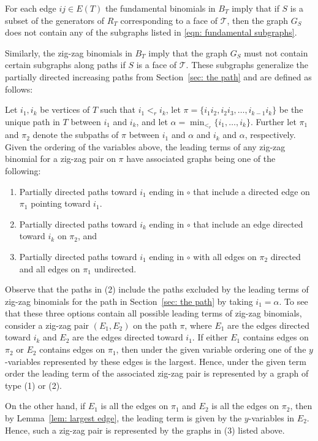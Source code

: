 \documentclass[11pt]{article}
\theoremstyle{definition}
\numberwithin{equation}{section}
\begin{document}
For each edge $ij\in E(T)$ the fundamental binomials in $B_T$ imply that if $S$ is a subset of the generators of $R_T$ corresponding to a face of $\mathcal{T}$, then the graph $G_S$ does not contain any of the subgraphs listed in \eqref{eqn: fundamental subgraphs}.


Similarly, the zig-zag binomials in $B_T$ imply that the graph $G_S$ must not contain certain subgraphs along paths if $S$ is a face of $\mathcal{T}$. These subgraphs generalize the partially directed increasing paths from Section~\ref{sec: the path} and are defined as follows:

Let $i_1,i_k$ be vertices of $T$ such that $i_1 <_r i_k$, let $\pi = \{i_1i_2, i_2i_3, \ldots, i_{k-1}i_k\}$ be the unique path in $T$ between $i_1$ and $i_k$, and let $\alpha = \min_{<_r}\{i_1,\ldots, i_k\}$. 
Further let $\pi_1$ and $\pi_2$ denote the subpaths of $\pi$ between $i_1$ and $\alpha$ and $i_k$ and $\alpha$, respectively. 
Given the ordering of the variables above, the leading terms of any zig-zag binomial for a zig-zag pair on $\pi$ have associated graphs being one of the following:
\begin{enumerate}
    \item Partially directed paths toward $i_1$ ending in $\circ$ that include a directed edge on $\pi_1$ pointing toward $i_1$. 
    \item Partially directed paths toward $i_k$ ending in $\circ$ that include an edge directed toward $i_k$ on $\pi_2$, and
    \item Partially directed paths toward $i_1$ ending in $\circ$ with all edges on $\pi_2$ directed and all edges on $\pi_1$ undirected. 
\end{enumerate}

Observe that the paths in (2) include the paths excluded by the leading terms of zig-zag binomials for the path in Section~\ref{sec: the path} by taking $i_1 = \alpha$. 
To see that these three options contain all possible leading terms of zig-zag binomials, consider a zig-zag pair $(E_1,E_2)$ on the path $\pi$, where $E_1$ are the edges directed toward $i_k$ and $E_2$ are the edges directed toward $i_1$. 
If either $E_1$ contains edges on $\pi_2$ or $E_2$ contains edges on $\pi_1$, then under the given variable ordering one of the $y$-variables represented by these edges is the largest.  
Hence, under the given term order the leading term of the associated zig-zag pair is represented by a graph of type (1) or (2).  

On the other hand, if $E_1$ is all the edges on $\pi_1$ and $E_2$ is all the edges on $\pi_2$, then by Lemma~\ref{lem: largest edge}, the leading term is given by the $y$-variables in $E_2$.  
Hence, such a zig-zag pair is represented by the graphs in (3) listed above. 
\end{document}
